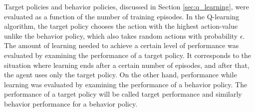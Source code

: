 \documentclass[english, 12pt, a4paper, elec, utf8, a-1b, online]{aaltothesis}
\begin{document}
Target policies and behavior policies, discussed in Section \ref{sec:q_learning}, were evaluated as a function of the number of training episodes.
In the Q-learning algorithm, the target policy chooses the action with the highest action-value unlike 
the behavior policy, which also takes random actions with probability $\epsilon$.
The amount of learning needed to achieve a certain level of performance was evaluated by examining the performance of a target policy.
It corresponds to the situation where learning ends after a certain number of episodes, and after that, the agent uses only the target policy.
On the other hand, performance while learning was evaluated by examining the performance of a behavior policy.
The performance of a target policy will be called target performance and similarly behavior performance for a behavior policy.
\end{document}
